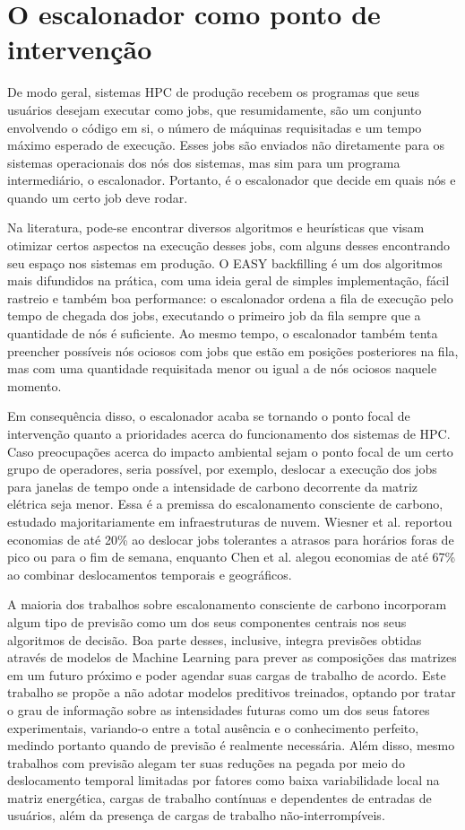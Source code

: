 \section{O escalonador como ponto de intervenção}
\label{sec:escalonador_como_intervencao}

De modo geral, sistemas HPC de produção recebem os programas que seus usuários
desejam executar como jobs, que resumidamente, são um conjunto envolvendo o código
em si, o número de máquinas requisitadas e um tempo máximo esperado de execução. 
Esses jobs são enviados não diretamente para os sistemas operacionais dos nós dos sistemas,
mas sim para um programa intermediário, o escalonador. Portanto, é o escalonador
que decide em quais nós e quando um certo job deve rodar.

Na literatura, pode-se encontrar diversos algoritmos e heurísticas que visam otimizar certos 
aspectos na execução desses jobs, com alguns desses encontrando seu espaço nos sistemas em produção.
O EASY backfilling é um dos algoritmos mais difundidos na prática, com uma ideia geral
de simples implementação, fácil rastreio e também boa performance: o escalonador ordena a fila de
execução pelo tempo de chegada dos jobs, executando o primeiro job da fila sempre que a quantidade
de nós é suficiente. Ao mesmo tempo, o escalonador também tenta preencher possíveis nós ociosos com
jobs que estão em posições posteriores na fila, mas com uma quantidade requisitada menor ou igual
a de nós ociosos naquele momento. 

Em consequência disso, o escalonador acaba se tornando o ponto focal de intervenção quanto a 
prioridades acerca do funcionamento dos sistemas de HPC. Caso preocupações acerca do impacto ambiental
sejam o ponto focal de um certo grupo de operadores, seria possível, por exemplo, deslocar a execução
dos jobs para janelas de tempo onde a intensidade de carbono decorrente da matriz elétrica seja menor.
Essa é a premissa do escalonamento consciente de carbono, estudado majoritariamente em infraestruturas
de nuvem. Wiesner et al. reportou economias de até 20\% ao deslocar jobs tolerantes a atrasos para horários
foras de pico ou para o fim de semana, enquanto Chen et al. alegou economias de até 67\% ao combinar
deslocamentos temporais e geográficos.

A maioria dos trabalhos sobre escalonamento consciente de carbono incorporam algum tipo de previsão
como um dos seus componentes centrais nos seus algoritmos de decisão. Boa parte desses, inclusive, 
integra previsões obtidas através de modelos de Machine Learning para prever as composições das matrizes 
em um futuro próximo e poder agendar suas cargas de trabalho de acordo. Este trabalho se propõe a 
não adotar modelos preditivos treinados, optando por tratar o grau de informação sobre as intensidades
futuras como um dos seus fatores experimentais, variando-o entre a total ausência e o conhecimento perfeito,
medindo portanto quando de previsão é realmente necessária. Além disso, mesmo trabalhos com previsão
alegam ter suas reduções na pegada por meio do deslocamento temporal limitadas por fatores como baixa variabilidade local na matriz energética,
cargas de trabalho contínuas e dependentes de entradas de usuários, além da presença de cargas de trabalho
não-interrompíveis.

